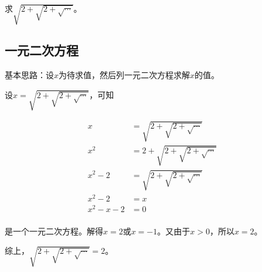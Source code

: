

求$\sqrt{2 + \sqrt{2 + \sqrt\cdots}}$。


\subsection{一元二次方程}

基本思路：设$x$为待求值，然后列一元二次方程求解$x$的值。

设$x = \sqrt{2 + \sqrt{2 + \sqrt\cdots}}$，可知

\begin{align*}
  x &= \sqrt{2 + \sqrt{2 + \sqrt\cdots}} \\
  x^2 &= 2 + \sqrt{2 + \sqrt{2 + \sqrt\cdots}} \\
  x^2 - 2 &= \sqrt{2 + \sqrt{2 + \sqrt\cdots}} \\
  x^2 - 2 &= x \\
  x^2 - x - 2 &= 0 \\
\end{align*}

是一个一元二次方程。解得$x = 2$或$x = -1$。又由于$x > 0$，所以$x = 2$。

综上，$\sqrt{2 + \sqrt{2 + \sqrt\cdots}} = 2$。
